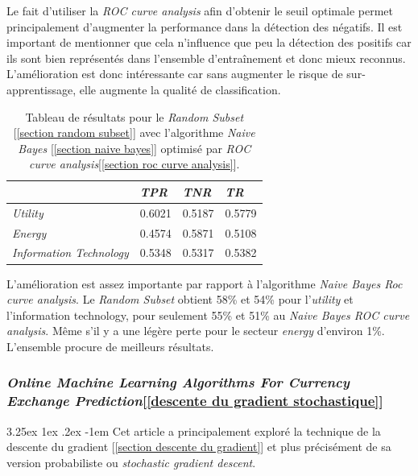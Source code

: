 \documentclass[a4paper, 11pt]{article}
\makeatletter
\newcounter{subsubsubsection}[subsubsection]
\renewcommand\paragraph{\@startsection{paragraph}{5}{\z@}%
  {3.25ex \@plus1ex \@minus.2ex}%
  {-1em}%
  {\normalfont\normalsize\bfseries}}
\makeatother
\begin{document}
Le fait d'utiliser la \textit{ROC curve analysis} afin d'obtenir le seuil optimale permet principalement d'augmenter la performance dans la détection des négatifs. Il est important de mentionner que cela n'influence que peu la détection des positifs car ils sont bien représentés dans l'ensemble d'entraînement et donc mieux reconnus. L'amélioration est donc intéressante car sans augmenter le risque de sur-apprentissage, elle augmente la qualité de classification.

\begin{table}[h!]
	\centering
\begin{tabular}{|l|l|l|l|}
	\hline
	\ & \textit{TPR} & \textit{TNR} & \textit{TR}\\
	\hline
	\textit{Utility} & 0.6021 & 0.5187 & 0.5779 \\
	\hline
	\textit{Energy} & 0.4574 & 0.5871 & 0.5108\\
	\hline
	\textit{Information Technology} & 0.5348 & 0.5317 & 0.5382\\
	\hline
\end{tabular}
\caption{Tableau de résultats pour le \textit{Random Subset} [\ref{section random subset}] avec l'algorithme \textit{Naive Bayes} [\ref{section naive bayes}] optimisé par \textit{ROC curve analysis}[\ref{section roc curve analysis}].}
\end{table}

L'amélioration est assez importante par rapport à l'algorithme \textit{Naive Bayes Roc curve analysis}. Le \textit{Random Subset} obtient 58\% et 54\% pour l'\textit{utility} et l'{information technology}, pour seulement 55\% et 51\% au \textit{Naive Bayes ROC curve analysis}. Même s'il y a une légère perte pour le secteur \textit{energy} d'environ 1\%.
L'ensemble procure de meilleurs résultats.

\subsubsection{\textit{Online Machine Learning Algorithms For Currency Exchange Prediction}[\ref{descente du gradient stochastique}]}

\paragraph{}
Cet article a principalement exploré la technique de la descente du gradient [\ref{section descente du gradient}] et plus précisément de sa version probabiliste ou \textit{stochastic gradient descent}.
\end{document}
